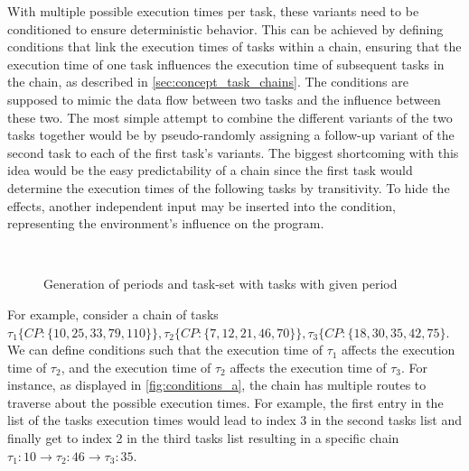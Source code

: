 With multiple possible execution times per task, these variants need to be conditioned to ensure deterministic behavior.
This can be achieved by defining conditions that link the execution times of tasks within a chain, ensuring that the execution time of one task influences the execution time of subsequent tasks in the chain, as described in \cref{sec:concept_task_chains}.
The conditions are supposed to mimic the data flow between two tasks and the influence between these two.
The most simple attempt to combine the different variants of the two tasks together would be by pseudo-randomly assigning a follow-up variant of the second task to each of the first task's variants.
The biggest shortcoming with this idea would be the easy predictability of a chain since the first task would determine the execution times of the following tasks by transitivity.
To hide the effects, another independent input may be inserted into the condition, representing the environment's influence on the program.


\begin{figure}[ht]
        \resizebox{\textwidth}{!}{%
            \label{fig:conditions_a}
            
 }
    \caption{Generation of periods and task-set with tasks with given period}
\end{figure}

For example, consider a chain of tasks \( \tau_1 \{ CP: \{10,25,33,79,110\}\}, \tau_2 \{ CP: \{7,12,21,46,70\}\}, \tau_3 \{CP: \{18,30,35,42,75\} \).
We can define conditions such that the execution time of \( \tau_1 \) affects the execution time of \( \tau_2 \), and the execution time of \( \tau_2 \) affects the execution time of \( \tau_3 \). 
For instance, as displayed in \cref{fig:conditions_a}, the chain has multiple routes to traverse about the possible execution times.
For example, the first entry in the list of the tasks execution times would lead to index 3 in the second tasks list and finally get to index 2 in the third tasks list resulting in a specific chain \( \tau_1: 10 \rightarrow \tau_2: 46 \rightarrow \tau_3: 35 \).

